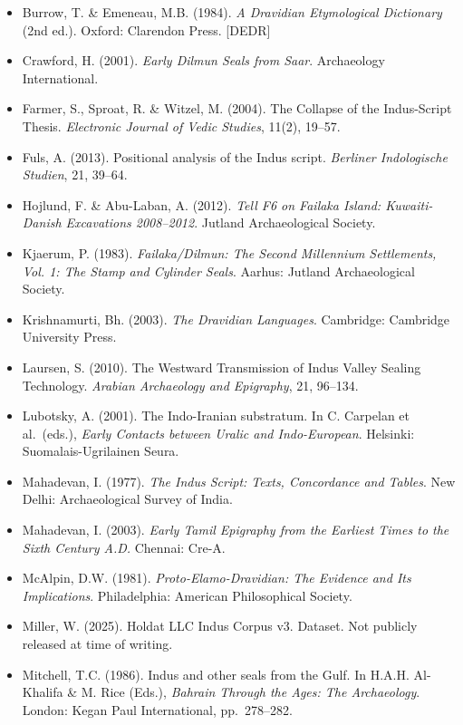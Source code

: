 \documentclass[
  11pt,
]{article}
\providecommand{\tightlist}{%
  \setlength{\itemsep}{0pt}\setlength{\parskip}{0pt}}
\begin{document}
\begin{itemize}
\tightlist
\item
  Burrow, T. \& Emeneau, M.B. (1984). \emph{A Dravidian Etymological
  Dictionary} (2nd ed.). Oxford: Clarendon Press. {[}DEDR{]}
\item
  Crawford, H. (2001). \emph{Early Dilmun Seals from Saar}. Archaeology
  International.
\item
  Farmer, S., Sproat, R. \& Witzel, M. (2004). The Collapse of the
  Indus-Script Thesis. \emph{Electronic Journal of Vedic Studies},
  11(2), 19--57.
\item
  Fuls, A. (2013). Positional analysis of the Indus script.
  \emph{Berliner Indologische Studien}, 21, 39--64.
\item
  Hojlund, F. \& Abu-Laban, A. (2012). \emph{Tell F6 on Failaka Island:
  Kuwaiti-Danish Excavations 2008--2012}. Jutland Archaeological
  Society.
\item
  Kjaerum, P. (1983). \emph{Failaka/Dilmun: The Second Millennium
  Settlements, Vol. 1: The Stamp and Cylinder Seals}. Aarhus: Jutland
  Archaeological Society.
\item
  Krishnamurti, Bh. (2003). \emph{The Dravidian Languages}. Cambridge:
  Cambridge University Press.
\item
  Laursen, S. (2010). The Westward Transmission of Indus Valley Sealing
  Technology. \emph{Arabian Archaeology and Epigraphy}, 21, 96--134.
\item
  Lubotsky, A. (2001). The Indo-Iranian substratum. In C. Carpelan et
  al.~(eds.), \emph{Early Contacts between Uralic and Indo-European}.
  Helsinki: Suomalais-Ugrilainen Seura.
\item
  Mahadevan, I. (1977). \emph{The Indus Script: Texts, Concordance and
  Tables}. New Delhi: Archaeological Survey of India.
\item
  Mahadevan, I. (2003). \emph{Early Tamil Epigraphy from the Earliest
  Times to the Sixth Century A.D.} Chennai: Cre-A.
\item
  McAlpin, D.W. (1981). \emph{Proto-Elamo-Dravidian: The Evidence and
  Its Implications}. Philadelphia: American Philosophical Society.
\item
  Miller, W. (2025). Holdat LLC Indus Corpus v3. Dataset. Not publicly
  released at time of writing.
\item
  Mitchell, T.C. (1986). Indus and other seals from the Gulf. In H.A.H.
  Al-Khalifa \& M. Rice (Eds.), \emph{Bahrain Through the Ages: The
  Archaeology}. London: Kegan Paul International, pp.~278--282.

\end{itemize}
\end{document}

